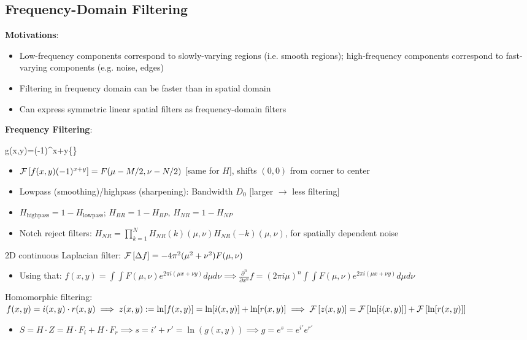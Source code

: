 \documentclass[12pt]{extarticle}
\begin{document}
\subsection{Frequency-Domain Filtering}
\textbf{Motivations}: \begin{itemize}
    \item Low-frequency components correspond to slowly-varying regions (i.e. smooth regions); high-frequency components correspond to fast-varying components (e.g. noise, edges)
    \item Filtering in frequency domain can be faster than in spatial domain
    \item Can express symmetric linear spatial filters as frequency-domain filters
\end{itemize}
\textbf{Frequency Filtering}: \begin{eqnbox}
    g(x,y)=(-1)^{x+y}\cdot{}\left\{\right\}
\end{eqnbox}
\begin{itemize}
    \item $\mathcal{F}\left[f(x,y)(-1)^{x+y}\right]=F(\mu-M/2,\nu-N/2)$ [same for $H$], shifts $(0,0)$ from corner to center
    \item Lowpass (smoothing)/highpass (sharpening): Bandwidth $D_0$ [larger $\to$ less filtering]
    \item $H_{\text{highpass}}=1-H_{\text{lowpass}}$; $H_{BR}=1-H_{BP}$, $H_{NR}=1-H_{NP}$
    \item Notch reject filters: $H_{NR}=\prod_{k=1}^NH_{NR}{(k)}(\mu,\nu)H_{NR}{(-k)}(\mu,\nu)$, for spatially dependent noise
\end{itemize}
2D continuous Laplacian filter: $\mathcal{F}\left[\Delta f\right]=-4\pi^2(\mu^2+\nu^2)F(\mu,\nu)$ \begin{itemize}
    \item Using that: $f(x,y)=\int\int F(\mu,\nu)e^{2\pi i(\mu x+\nu y)}d\mu d\nu\implies\frac{\partial^n}{\partial x^n}f=(2\pi i\mu)^n\int\int F(\mu,\nu)e^{2\pi i(\mu x+\nu y)}d\mu d\nu$
\end{itemize}

\newp
Homomorphic filtering: $f(x,y)=i(x,y)\cdot r(x,y)\implies z(x,y):=\ln[f(x,y)]=\ln[i(x,y)]+\ln[r(x,y)]\implies \mathcal{F}\left[z(x,y)\right]=\mathcal{F}\left[\ln[i(x,y)]\right]+\mathcal{F}\left[\ln[r(x,y)]\right]$ \begin{itemize}
    \item $S=H\cdot Z=H\cdot F_i+H\cdot F_r\implies s=i'+r'=\ln(g(x,y))\implies g=e^s=e^{i'}e^{r'}$
\end{itemize}
\end{document}
